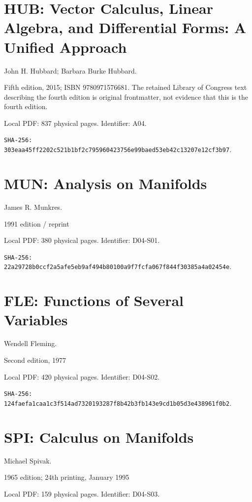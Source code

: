 \documentclass[11pt,oneside,openany]{book}
\theoremstyle{definition}
\theoremstyle{remark}
\begin{document}
\section*{HUB: Vector Calculus, Linear Algebra, and Differential Forms: A Unified Approach}

John H. Hubbard; Barbara Burke Hubbard.

Fifth edition, 2015; ISBN 9780971576681. The retained Library of Congress text describing the fourth edition is original frontmatter, not evidence that this is the fourth edition.

Local PDF: 837 physical pages. Identifier: A04.

\par\noindent\texttt{SHA-256: 303eaa45ff2202c521b1bf2c79596042\allowbreak 3756e99baed53eb42c13207e12cf3b97}.

\section*{MUN: Analysis on Manifolds}

James R. Munkres.

1991 edition / reprint

Local PDF: 380 physical pages. Identifier: D04-S01.

\par\noindent\texttt{SHA-256: 22a29728b0ccf2a5afe5eb9af494b801\allowbreak 00a9f7fcfa067f844f30385a4a02454e}.

\section*{FLE: Functions of Several Variables}

Wendell Fleming.

Second edition, 1977

Local PDF: 420 physical pages. Identifier: D04-S02.

\par\noindent\texttt{SHA-256: 124faefa1caa1c3f514ad7320193287f\allowbreak 8b42b3fb143e9cd1b05d3e438961f0b2}.

\section*{SPI: Calculus on Manifolds}

Michael Spivak.

1965 edition; 24th printing, January 1995

Local PDF: 159 physical pages. Identifier: D04-S03.
\end{document}
